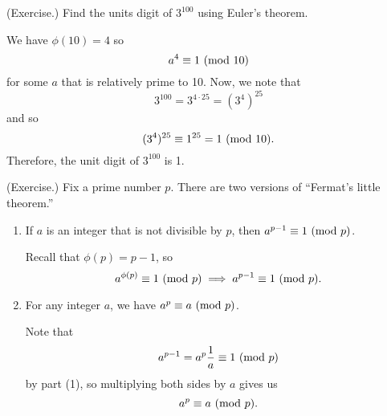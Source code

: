 \documentclass[letterpaper]{article}
\begin{document}
\begin{mdframed}
    (Exercise.) Find the units digit of $3^{100}$ using Euler's theorem.

    \begin{mdframed}
        We have $\phi(10) = 4$ so 
        \[a^{4} \equiv 1 \ (\mathrm{mod}\ 10)\]
        for some $a$ that is relatively prime to 10. Now, we note that 
        \[3^{100} = 3^{4 \cdot 25} = (3^4)^{25}\]
        and so 
        \[(3^4)^{25} \equiv 1^{25} = 1 \ (\mathrm{mod}\ 10).\]
        Therefore, the unit digit of $3^{100}$ is 1.
    \end{mdframed}
\end{mdframed}

\begin{mdframed}
    (Exercise.) Fix a prime number $p$. There are two versions of ``Fermat's little theorem.''
    \begin{enumerate}
        \item If $a$ is an integer that is not divisible by $p$, then $a^{p - 1} \equiv 1 \ (\mathrm{mod}\ p)$. 
        
        \begin{mdframed}
            Recall that $\phi(p) = p - 1$, so 
            \[a^{\phi(p)} \equiv 1 \ (\mathrm{mod}\ p) \implies a^{p - 1} \equiv 1 \ (\mathrm{mod}\ p).\]
        \end{mdframed}

        \item For any integer $a$, we have $a^p \equiv a \ (\mathrm{mod}\ p)$. 
        
        \begin{mdframed}
            Note that 
            \[a^{p - 1} = a^p \frac{1}{a} \equiv 1 \ (\mathrm{mod}\ p)\]
            by part (1), so multiplying both sides by $a$ gives us 
            \[a^p \equiv a \ (\mathrm{mod}\ p).\]
        \end{mdframed}
    \end{enumerate}
\end{mdframed}
\end{document}
